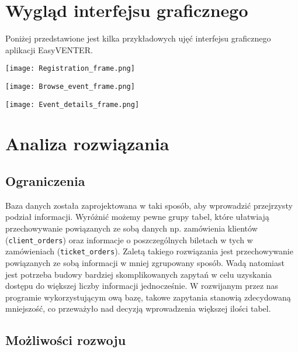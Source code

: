 \documentclass[12pt]{article}
\begin{document}
\section{Wygląd interfejsu graficznego}

    Poniżej przedstawione jest kilka przykładowych ujęć interfejsu graficznego aplikacji EasyVENTER.
    
    \begin{center}
    \texttt{[image: Registration\_frame.png]}
    \end{center}
    
    \begin{center}
    \texttt{[image: Browse\_event\_frame.png]}
    \end{center}
    
    \begin{center}
    \texttt{[image: Event\_details\_frame.png]}
    \end{center}
        
\section{Analiza rozwiązania}

    \subsection{Ograniczenia}
        
        Baza danych została zaprojektowana w taki sposób, aby wprowadzić przejrzysty podział informacji. Wyróżnić możemy pewne grupy tabel, które ułatwiają przechowywanie powiązanych ze sobą danych np. zamówienia klientów ({\tt client\_orders}) oraz informacje o poszczególnych biletach w tych w zamówieniach ({\tt ticket\_orders}). Zaletą takiego rozwiązania jest przechowywanie powiązanych ze sobą informacji w mniej zgrupowany sposób. Wadą natomiast jest potrzeba budowy bardziej skomplikowanych zapytań w celu uzyskania dostępu do większej liczby informacji jednocześnie. W rozwijanym przez nas programie wykorzystującym ową bazę, takowe zapytania stanowią zdecydowaną mniejszość, co przeważyło nad decyzją wprowadzenia większej ilości tabel.
    
    \subsection{Możliwości rozwoju}
    
\end{document}
